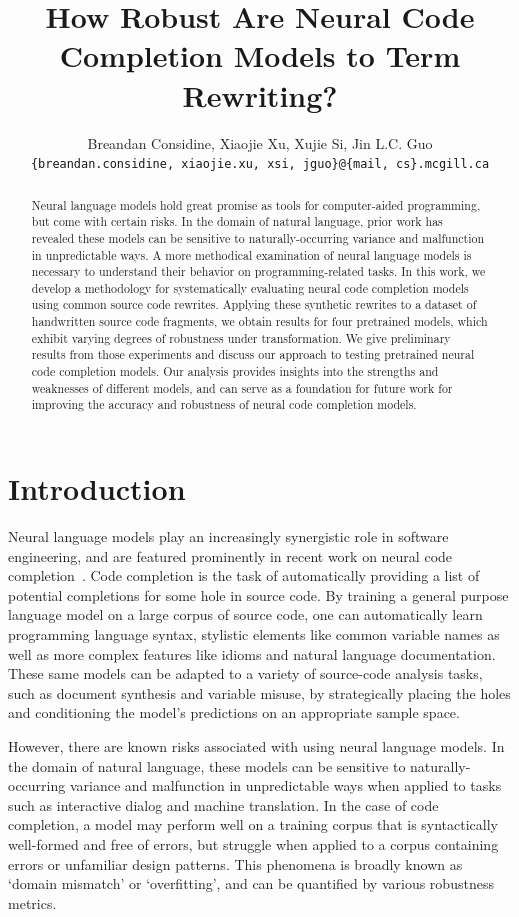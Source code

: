 \documentclass[usenames,dvipsnames]{article} %
\title{How Robust Are Neural Code Completion Models to Term Rewriting?}
\author{Breandan Considine, Xiaojie Xu, Xujie Si, Jin L.C. Guo\\
\texttt{\{breandan.considine, xiaojie.xu, xsi, jguo\}@\{mail, cs\}.mcgill.ca}\\
}
\begin{document}
  \maketitle

  \begin{abstract}
    Neural language models hold great promise as tools for computer-aided programming, but come with certain risks. In the domain of natural language, prior work has revealed these models can be sensitive to naturally-occurring variance and malfunction in unpredictable ways. A more methodical examination of neural language models is necessary to understand their behavior on programming-related tasks. In this work, we develop a methodology for systematically evaluating neural code completion models using common source code rewrites. Applying these synthetic rewrites to a dataset of handwritten source code fragments, we obtain results for four pretrained models, which exhibit varying degrees of robustness under transformation. We give preliminary results from those experiments and discuss our approach to testing pretrained neural code completion models. Our analysis provides insights into the strengths and weaknesses of different models, and can serve as a foundation for future work for improving the accuracy and robustness of neural code completion models.
  \end{abstract}

  \section{Introduction}\label{sec:introduction}

  Neural language models play an increasingly synergistic role in software engineering, and are featured prominently in recent work on neural code completion~\cite{chen2021evaluating}. Code completion is the task of automatically providing a list of potential completions for some hole in source code. By training a general purpose language model on a large corpus of source code, one can automatically learn programming language syntax, stylistic elements like common variable names as well as more complex features like idioms and natural language documentation. These same models can be adapted to a variety of source-code analysis tasks, such as document synthesis and variable misuse, by strategically placing the holes and conditioning the model's predictions on an appropriate sample space.

  However, there are known risks associated with using neural language models. In the domain of natural language, these models can be sensitive to naturally-occurring variance and malfunction in unpredictable ways when applied to tasks such as interactive dialog and machine translation. In the case of code completion, a model may perform well on a training corpus that is syntactically well-formed and free of errors, but struggle when applied to a corpus containing errors or unfamiliar design patterns. This phenomena is broadly known as `domain mismatch' or `overfitting', and can be quantified by various robustness metrics.
\end{document}
